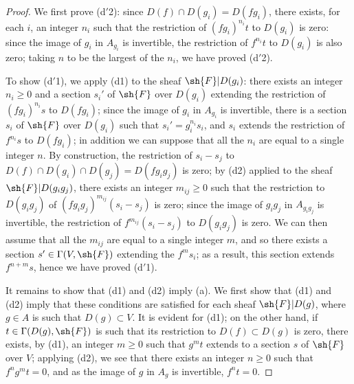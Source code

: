 \begin{proof}
We first prove (d$'$2): since $D(f)\cap D(g_i)=D(fg_i)$, there exists, for each $i$, an integer $n_i$ such that the restriction of $(fg_i)^{n_i}t$ to $D(g_i)$ is zero:
since the image of $g_i$ in $A_{g_i}$ is invertible, the restriction of $f^{n_i}t$ to $D(g_i)$ is also zero;
taking $n$ to be the largest of the $n_i$, we have proved (d$'$2).

To show (d$'$1), we apply (d1) to the sheaf $\sh{F}|D(g_i)$: there exists an integer $n_i\geq 0$ and a section $s_i'$ of $\sh{F}$ over $D(g_i)$ extending the restriction of $(fg_i)^{n_i}s$ to $D(fg_i)$;
since the image of $g_i$ in $A_{g_i}$ is invertible, there is a section $s_i$ of $\sh{F}$ over $D(g_i)$ such that $s_i'=g_i^{n_i}s_i$, and $s_i$ extends the
restriction of $f^{n_i}s$ to $D(fg_i)$;
in addition we can suppose that all the $n_i$ are equal to a single integer $n$.
By construction, the restriction of $s_i-s_j$ to $D(f)\cap D(g_i)\cap D(g_j)=D(fg_i g_j)$ is zero;
by (d2) applied to the sheaf $\sh{F}|D(g_i g_j)$, there exists an integer $m_{ij}\geq 0$ such that the restriction to $D(g_i g_j)$ of $(fg_i g_j)^{m_{ij}}(s_i-s_j)$ is zero;
since the image of $g_i g_j$ in $A_{g_i g_j}$ is invertible, the restriction of $f^{m_{ij}}(s_i-s_j)$ to $D(g_i g_j)$ is zero.
We can then assume that all the $m_{ij}$ are equal to a single integer $m$, and so there exists a section $s'\in\Gamma(V,\sh{F})$ extending the $f^m s_i$;
as a result, this section extends $f^{n+m}s$, hence we have proved (d$'$1).

It remains to show that (d1) and (d2) imply (a).
We first show that (d1) and (d2) imply that these conditions are satisfied for each sheaf $\sh{F}|D(g)$, where $g\in A$ is such that $D(g)\subset V$.
It is evident for (d1);
on the other hand, if $t\in\Gamma(D(g),\sh{F})$ is such that its restriction to $D(f)\subset D(g)$ is zero, there exists, by (d1), an integer $m\geq 0$ such that $g^m t$
extends to a section $s$ of $\sh{F}$ over $V$;
applying (d2), we see that there exists an integer $n\geq 0$ such that $f^n g^m t=0$, and as the image of $g$ in $A_g$ is invertible, $f^n t=0$.


\end{proof}
